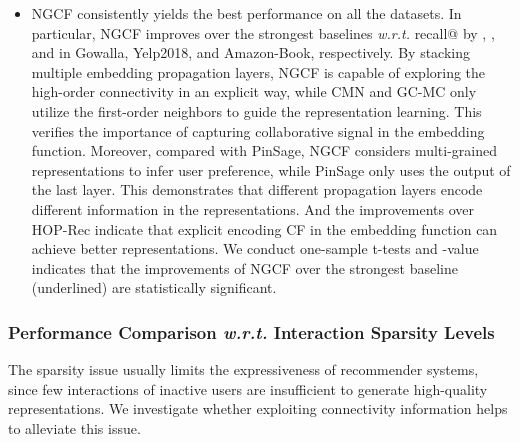 \documentclass[sigconf]{acmart}
\newcommand{\wrt}{\emph{w.r.t. }}
\theoremstyle{definition}
\begin{document}
\begin{itemize}[leftmargin=*]
\item NGCF consistently yields the best performance on all the datasets.
In particular, NGCF improves over the strongest baselines \wrt recall@ by , , and  in Gowalla, Yelp2018, and Amazon-Book, respectively.
By stacking multiple embedding propagation layers, NGCF is capable of exploring the high-order connectivity in an explicit way, while CMN and GC-MC only utilize the first-order neighbors to guide the representation learning.
This verifies the importance of capturing collaborative signal in the embedding function.
Moreover, compared with PinSage, NGCF considers multi-grained representations to infer user preference, while PinSage only uses the output of the last layer.
This demonstrates that different propagation layers encode different information in the representations.
And the improvements over HOP-Rec indicate that explicit encoding CF in the embedding function can achieve better representations.
We conduct one-sample t-tests and -value  indicates that the improvements of NGCF over the strongest baseline (underlined) are statistically significant.

\end{itemize}


\subsubsection{\textbf{Performance Comparison \wrt Interaction Sparsity Levels}}\label{sec:sparsity}



The sparsity issue usually limits the expressiveness of recommender systems, since few interactions of inactive users are insufficient to generate high-quality representations.
We investigate whether exploiting connectivity information helps to alleviate this issue.
\end{document}
